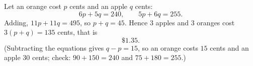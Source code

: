 Let an orange cost $p$ cents and an apple $q$ cents:
\[
6p+5q=240,\qquad 5p+6q=255 .
\]
Adding, $11p+11q=495$, so $p+q=45$. Hence $3$ apples and $3$ oranges cost $3(p+q)=135$ cents, that is
\[
\boxed{\$1.35}.
\]
(Subtracting the equations gives $q-p=15$, so an orange costs $15$ cents and an apple $30$ cents; check: $90+150=240$ and $75+180=255$.)
